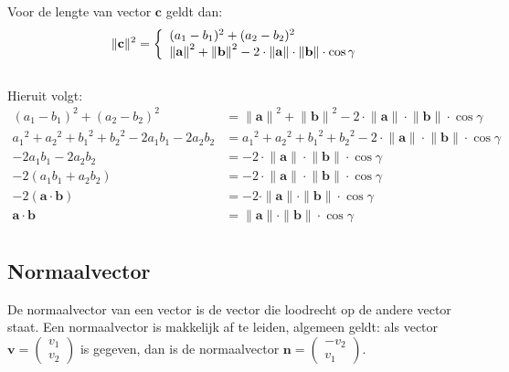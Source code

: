 \documentclass[12pt,a4paper]{article}
\begin{document}
	Voor de lengte van vector $\mathbf{c}$ geldt dan:
 	\begin{equation}
		\begin{aligned}
			\|\mathbf{c}\|^2 = \left\{ 
				\begin{array}{l l}
 	 				(a_1-b_1)^2+(a_2-b_2)^2 \\
  					{\|\mathbf{a}\|}^2 + {\|\mathbf{b}\|}^2 - 2 \cdot \|\mathbf{a}\| \cdot \|\mathbf{b}\| \cdot \cos\gamma 
 	 			\end{array} 
 	 		\right.
		\end{aligned}
	\end{equation}
	\\Hieruit volgt:
	\begin{equation}
		\label{inproduct-cosinus}
		\begin{aligned}
			(a_1-b_1)^2 + (a_2-b_2)^2 &= {\|\mathbf{a}\|}^2 + {\|\mathbf{b}\|}^2 - 2 \cdot {\|\mathbf{a}\|} \cdot {\|\mathbf{b}\|} \cdot \cos\gamma \\
			{a_1}^2 + {a_2}^2+ {b_1}^2 + {b_2}^2 - 2a_1b_1 - 2a_2b_2 &= {a_1}^2 + {a_2}^2+ {b_1}^2 + {b_2}^2 - 2 \cdot {\|\mathbf{a}\|} \cdot {\|\mathbf{b}\|} \cdot \cos\gamma \\
			-2a_1b_1 - 2a_2b_2 &= - 2 \cdot {\|\mathbf{a}\|} \cdot {\|\mathbf{b}\|} \cdot \cos\gamma \\
			-2(a_1b_1 + a_2b_2) &= - 2 \cdot {\|\mathbf{a}\|} \cdot {\|\mathbf{b}\|} \cdot \cos\gamma \\
			-2(\mathbf{a} \cdot \mathbf{b}) &= - 2 \cdot \|\mathbf{a}\| \cdot \|\mathbf{b}\| \cdot \cos\gamma \\
			\mathbf{a} \cdot \mathbf{b} &= \|\mathbf{a}\| \cdot \|\mathbf{b}\| \cdot \cos\gamma\\
		\end{aligned}
	\end{equation}
	
	\subsection{Normaalvector}
	De normaalvector van een vector is de vector die loodrecht op de andere vector staat. Een normaalvector is makkelijk af te leiden, algemeen geldt: als vector $\mathbf{v}=\begin{pmatrix} v_1 \\ v_2 \end{pmatrix}$ is gegeven, dan is de normaalvector $\mathbf{n}=\begin{pmatrix} -v_2 \\ v_1 \end{pmatrix}$.
	
\end{document}
